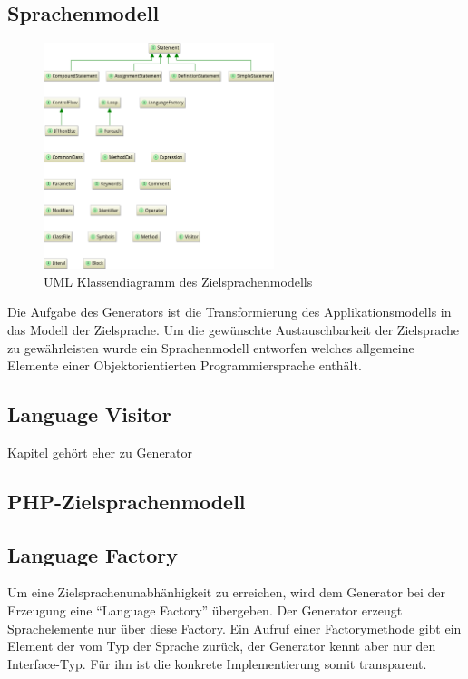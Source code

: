 \subsection{Sprachenmodell}
\label{sec:language_model}

\begin{figure}[tb]
    \begin{center}
        \includegraphics[width=0.6\textwidth]{resources/languagemodel_common}
    \end{center}
    \caption{UML Klassendiagramm des Zielsprachenmodells}
    \label{fig:language_model}
\end{figure}

Die Aufgabe des Generators ist die Transformierung des Applikationsmodells in das Modell der Zielsprache. Um die gewünschte Austauschbarkeit der Zielsprache zu gewährleisten wurde ein Sprachenmodell entworfen welches allgemeine Elemente einer Objektorientierten Programmiersprache enthält. %

\subsection{Language Visitor}
\label{sec:language_visitor}

Kapitel gehört eher zu Generator

\subsection{PHP-Zielsprachenmodell}
\label{sec:php_target_language_model}

\subsection{Language Factory}
\label{sec:language_factory}

Um eine Zielsprachenunabhänhigkeit zu erreichen, wird dem Generator bei der Erzeugung eine \enquote{Language Factory} übergeben. Der Generator erzeugt Sprachelemente nur über diese Factory. Ein Aufruf einer Factorymethode gibt ein Element der vom Typ der Sprache zurück, der Generator kennt aber nur den Interface-Typ. Für ihn ist die konkrete Implementierung somit transparent.
